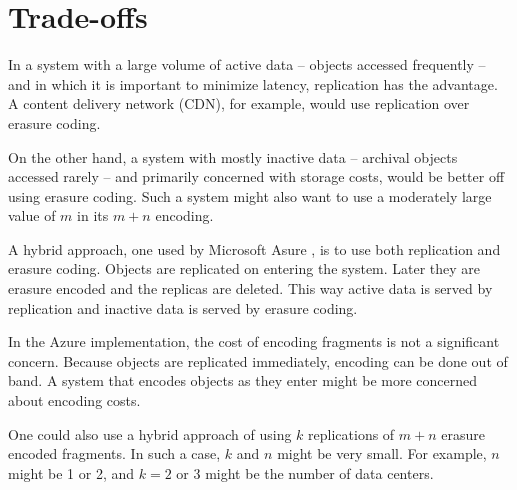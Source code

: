 \section{Trade-offs}

In a system with a large volume of active data -- objects accessed frequently -- and in which it is important to minimize latency, replication has the advantage. A content delivery network (CDN), for example, would use replication over erasure coding. 

On the other hand, a system with mostly inactive data -- archival objects accessed rarely -- and primarily concerned with storage costs, would be better off using erasure coding. Such a system might also want to use a moderately large value of $m$ in its $m+n$ encoding.

A hybrid approach, one used by Microsoft Asure \cite{lrc}, is to use both replication and erasure coding. Objects are replicated on entering the system. Later they are erasure encoded and the replicas are deleted. This way active data is served by replication and inactive data is served by erasure coding. 

In the Azure implementation, the cost of encoding fragments is not a significant concern. Because objects are replicated immediately, encoding can be done out of band. A system that encodes objects as they enter might be more concerned about encoding costs.

One could also use a hybrid approach of using $k$ replications of $m+n$ erasure encoded fragments. In such a case, $k$ and $n$ might be very small. For example, $n$ might be 1 or 2, and $k=2$ or 3 might be the number of data centers. 

